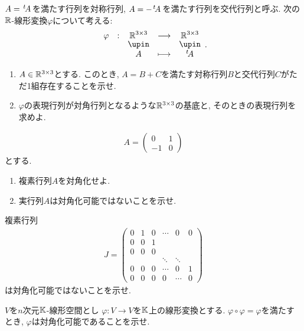 \begin{quiz}
  $A={\left.^{t}\!A\right.}$を満たす行列を対称行列,
  $A=-{\left.^{t}\!A\right.}$を満たす行列を交代行列と呼ぶ.
  次の$\mathbb{R}$-線形変換$\varphi$について考える:
  \begin{align*}
    \shazo{\varphi}{\RR^{3\times 3}}{\RR^{3\times 3}}
    {A}{\transposed{A}}.
  \end{align*}
  \begin{enumerate}
  \item $A\in \mathbb{R}^{3\times 3}$とする. このとき, $A=B+C$を満たす対称行列$B$と交代行列$C$がただ1組存在することを示せ.
  \item
      $\varphi$の表現行列が対角行列となるような$\mathbb{R}^{3\times 3}$の基底と,
  そのときの表現行列を求めよ.
  \end{enumerate}

\end{quiz}


\begin{quiz}
  \begin{align*}
    A=\begin{pmatrix}0&1\\-1&0\end{pmatrix}
  \end{align*}
  とする.
  \begin{enumerate}
  \item 複素行列$A$を対角化せよ.
  \item 実行列$A$は対角化可能ではないことを示せ.
  \end{enumerate}
\end{quiz}

\begin{quiz}
  複素行列
  \begin{align*}
    J=\begin{pmatrix}0&1&0&\cdots&0&0  \\0&0&1&\\0&0&0&\\&&&\ddots&\ddots\\0&0&0&\cdots&0&1\\0&0&0&0&\cdots&0\end{pmatrix}
  \end{align*}
  は対角化可能ではないことを示せ.
\end{quiz}

\begin{quiz}
  $V$を$n$次元$\mathbb{K}$-線形空間とし
  $\varphi\colon V\to V$を$\mathbb{K}$上の線形変換とする.
  $\varphi\circ \varphi = \varphi$を満たすとき,
  $\varphi$は対角化可能であることを示せ.
\end{quiz}

